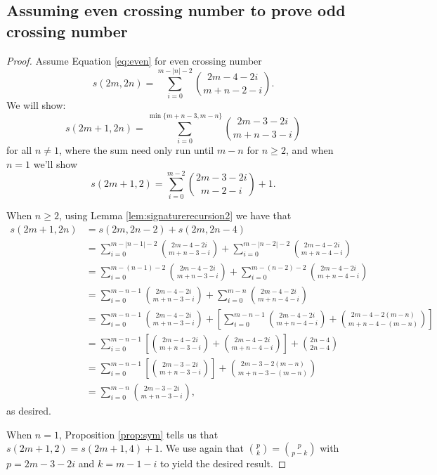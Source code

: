 \documentclass[11pt]{amsart}
\theoremstyle{definition}
\theoremstyle{remark}
\numberwithin{equation}{section}
\begin{document}
\subsection{Assuming even crossing number to prove odd crossing number}
\begin{proof}
Assume Equation \eqref{eq:even} for even crossing number
\[ s(2m,2n)=\sum_{i=0}^{m-|n|-2}{2m-4-2i \choose m+n-2-i}.\]
We will show:
\[s(2m+1,2n)=\sum_{i=0}^{\min\{m+n-3,m-n\}}{2m-3-2i\choose m+n-3-i}\]
for all $n \neq 1$, where the sum need only run until $m-n$ for $n\geq 2$, and when $n=1$ we'll show
\[s(2m+1,2)=\sum_{i=0}^{m-2}{2m-3-2i\choose m-2-i}+1.\]


When $n\geq 2$, using Lemma \ref{lem:signaturerecursion2}  we have that 
\begin{align*}
    s(2m+1,2n) & =s(2m,2n-2)+s(2m,2n-4) \\
    & = \sum_{i=0}^{m-|n-1|-2}{2m-4-2i\choose m+n-3-i} +\sum_{i=0}^{m-|n-2|-2}{2m-4-2i\choose m+n-4-i} \\
    & = \sum_{i=0}^{m-(n-1)-2}{2m-4-2i\choose m+n-3-i} +\sum_{i=0}^{m-(n-2)-2}{2m-4-2i\choose m+n-4-i} \\
    & = \sum_{i=0}^{m-n-1}{2m-4-2i\choose m+n-3-i} +\sum_{i=0}^{m-n}{2m-4-2i\choose m+n-4-i} \\
    & =  \sum_{i=0}^{m-n-1}{2m-4-2i\choose m+n-3-i}  +\left[ \sum_{i=0}^{m-n-1}{2m-4-2i\choose m+n-4-i} +  {2m-4-2(m-n)\choose m+n-4-(m-n)}\right]\\
    & = \sum_{i=0}^{m-n-1}\left[ {2m-4-2i\choose m+n-3-i} + {2m-4-2i\choose m+n-4-i}\right] + {2n-4\choose 2n-4} \\
    & = \sum_{i=0}^{m-n-1}\left[ {2m-3-2i\choose m+n-3-i}\right] + {2m-3-2(m-n)\choose m+n-3-(m-n)} \\
    & = \sum_{i=0}^{m-n}{2m-3-2i\choose m+n-3-i},
\end{align*}
as desired.

When $n=1$, Proposition \ref{prop:sym} tells us that $s(2m+1,2)=s(2m+1,4)+1$. 
We use again that ${p \choose k} = {p \choose p-k}$ with $p=2m-3-2i$ and $k=m-1-i$ to yield the desired result.




\end{proof}
\end{document}
